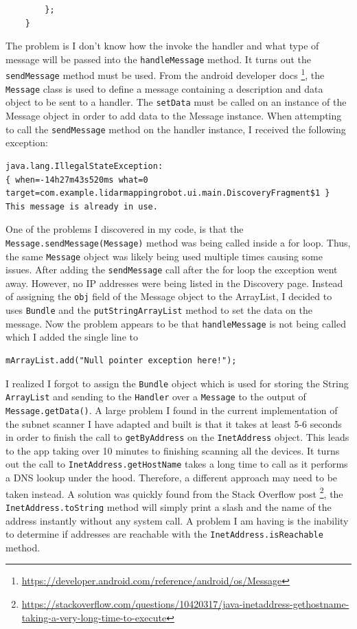 \documentclass[fontsize=11pt, %
                             paper=a4, %
                             twoside, %
                             captions=tableheading,
                             index=totoc,
                             hyperref]{labbook}
\begin{document}
\begin{addmargin}[0cm]{0cm}
\begin{Verbatim}
        };
    }
\end{Verbatim}
The problem is I don't know how the invoke the handler and what type of message will be passed into the \texttt{handleMessage} method. It turns out the \texttt{sendMessage} method must be used. From the android developer docs \footnote{\url{https://developer.android.com/reference/android/os/Message}}, the \texttt{Message} class is used to define a message containing a description and data object to be sent to a handler. The \texttt{setData} must be called on an instance of the Message object in order to add data to the Message instance. When attempting to call the \texttt{sendMessage} method on the handler instance, I received the following exception:
\begin{Verbatim}
java.lang.IllegalStateException: 
{ when=-14h27m43s520ms what=0 
target=com.example.lidarmappingrobot.ui.main.DiscoveryFragment$1 } 
This message is already in use.
\end{Verbatim}

One of the problems I discovered in my code, is that the \texttt{Message.sendMessage(Message)} method was being called inside a for loop. Thus, the same \texttt{Message} object was likely being used multiple times causing some issues. After adding the \texttt{sendMessage} call after the for loop the exception went away. However, no IP addresses were being listed in the Discovery page. Instead of assigning the \texttt{obj} field of the Message object to the ArrayList, I decided to uses \texttt{Bundle} and the \texttt{putStringArrayList} method to set the data on the message. Now the problem appears to be that \texttt{handleMessage} is not being called which I added the single line to 
\begin{Verbatim}
mArrayList.add("Null pointer exception here!");
\end{Verbatim}
I realized I forgot to assign the \texttt{Bundle} object which is used for storing the String \texttt{ArrayList} and sending to the \texttt{Handler} over a \texttt{Message} to the output of \texttt{Message.getData()}.
\smallbreak\noindent
A large problem I found in the current implementation of the subnet scanner I have adapted and built is that it takes at least 5-6 seconds in order to finish the call to \texttt{getByAddress} on the \texttt{InetAddress} object. This leads to the app taking over 10 minutes to finishing scanning all the devices. It turns out the call to \texttt{InetAddress.getHostName} takes a long time to call as it performs a DNS lookup under the hood. Therefore, a different approach may need to be taken instead. A solution was quickly found from the Stack Overflow post \footnote{\url{https://stackoverflow.com/questions/10420317/java-inetaddress-gethostname-taking-a-very-long-time-to-execute}}, the \texttt{InetAddress.toString} method will simply print a slash and the name of the address instantly without any system call. A problem I am having is the inability to determine if addresses are reachable with the \texttt{InetAddress.isReachable} method.


\end{addmargin}
\end{document}
